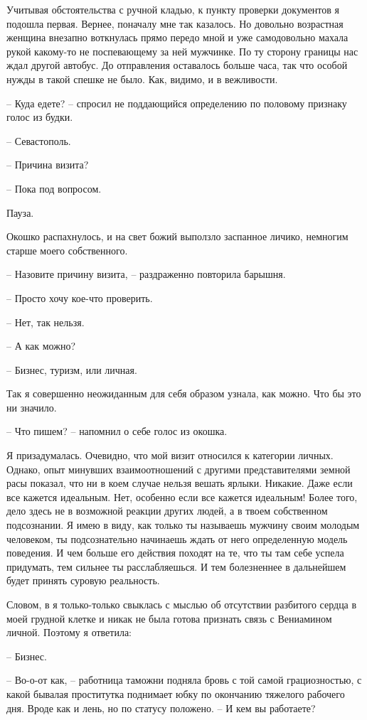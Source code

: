 \documentclass[
]{book}
\begin{document}
Учитывая обстоятельства с ручной кладью, к пункту проверки документов я подошла первая. Вернее, поначалу мне так казалось. Но довольно возрастная женщина внезапно воткнулась прямо передо мной и уже самодовольно махала рукой какому-то не поспевающему за ней мужчинке. По ту сторону границы нас ждал другой автобус. До отправления оставалось больше часа, так что особой нужды в такой спешке не было. Как, видимо, и в вежливости.

-- Куда едете? -- спросил не поддающийся определению по половому признаку голос из будки.

-- Севастополь.

-- Причина визита?

-- Пока под вопросом.

Пауза.

Окошко распахнулось, и на свет божий выползло заспанное личико, немногим старше моего собственного.

-- Назовите причину визита, -- раздраженно повторила барышня.

-- Просто хочу кое-что проверить.

-- Нет, так нельзя.

-- А как можно?

-- Бизнес, туризм, или личная.

Так я совершенно неожиданным для себя образом узнала, как можно. Что бы это ни значило.

-- Что пишем? -- напомнил о себе голос из окошка.

Я призадумалась. Очевидно, что мой визит относился к категории личных. Однако, опыт минувших взаимоотношений с другими представителями земной расы показал, что ни в коем случае нельзя вешать ярлыки. Никакие. Даже если все кажется идеальным. Нет, особенно если все кажется идеальным! Более того, дело здесь не в возможной реакции других людей, а в твоем собственном подсознании. Я имею в виду, как только ты называешь мужчину своим молодым человеком, ты подсознательно начинаешь ждать от него определенную модель поведения. И чем больше его действия походят на те, что ты там себе успела придумать, тем сильнее ты расслабляешься. И тем болезненнее в дальнейшем будет принять суровую реальность.

Словом, в я только-только свыклась с мыслью об отсутствии разбитого сердца в моей грудной клетке и никак не была готова признать связь с Вениамином личной. Поэтому я ответила:

-- Бизнес.

-- Во-о-от как, -- работница таможни подняла бровь с той самой грациозностью, с какой бывалая проститутка поднимает юбку по окончанию тяжелого рабочего дня. Вроде как и лень, но по статусу положено. -- И кем вы работаете?
\end{document}
